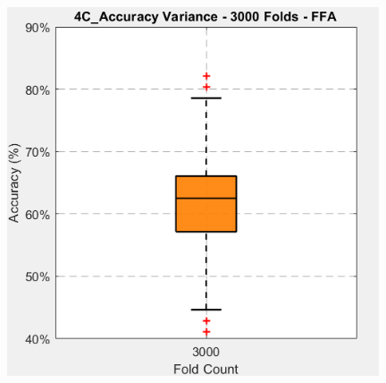 \begin{frame}
\begin{columns}
		\begin{column}{0.49\textwidth}
			\begin{itemize}
			\end{itemize}
			\begin{figure}
				\centering
				\includegraphics[width=0.98\textwidth]{assets/box_4C_3000_ffa.png}
			\end{figure}
		\end{column}
	\end{columns}
\end{frame}


